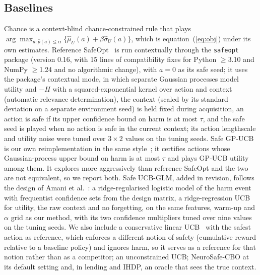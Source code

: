 \documentclass[10pt,a4paper]{article}
\begin{document}
\subsection*{Baselines}
Chance is a context-blind chance-constrained rule that plays
$\arg\max_{a:\hat p(a)\le\alpha}\{\hat\mu_U(a)+\beta\hat\sigma_U(a)\}$, which is equation~(\ref{eq:obj})
under its own estimates. Reference SafeOpt~\cite{sui2015safeopt} is run contextually through the
\texttt{safeopt} package (version 0.16, with 15 lines of compatibility fixes for Python $\ge$3.10 and
NumPy $\ge$1.24 and no algorithmic change), with $a=0$ as its safe seed; it uses the package's contextual mode, in which separate Gaussian processes model utility and $-H$ with a squared-exponential kernel over action and context (automatic relevance determination), the context (scaled by its standard deviation on a separate environment seed) is held fixed during acquisition, an action is safe if its upper confidence bound on harm is at most $\tau$, and the safe seed is played when no action is safe in the current context; its action lengthscale and utility noise were tuned over $3\times2$ values on the tuning seeds. Safe GP-UCB is our own
reimplementation in the same style~\cite{sui2015safeopt,sui2018stageopt}; it certifies actions whose
Gaussian-process upper bound on harm is at most $\tau$ and plays GP-UCB utility among them. It explores
more aggressively than reference SafeOpt and the two are not equivalent, so we report both. Safe UCB-GLM, added in revision, follows the design of Amani et al.~\cite{amani2020glm}: a ridge-regularised logistic model of the harm event with frequentist confidence sets from the design matrix, a ridge-regression UCB for utility, the raw context and no forgetting, on the same features, warm-up and $\alpha$ grid as our method, with its two confidence multipliers tuned over nine values on the tuning seeds. We also
include a conservative linear UCB~\cite{kazerouni2017conservative} with the safest action as reference, which enforces a different notion of safety (cumulative reward relative to a baseline policy) and ignores harm, so it serves as a reference for that notion rather than as a competitor; an unconstrained UCB; NeuroSafe-CBO at its default setting and, in lending and
IHDP, an oracle that sees the true context.
\end{document}
